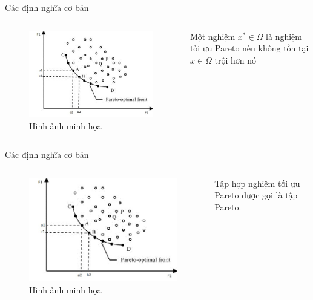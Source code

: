 \documentclass{beamer}
\begin{document}
    \begin{frame}{Các định nghĩa cơ bản}
        \begin{columns}
        \begin{figure}
            \centering
            \includegraphics[scale = 0.5]{paretofront.jpg}
            \caption{Hình ảnh minh họa}
            \label{fig:my_label}
        \end{figure}
        Một nghiệm $x^{*} \in \Omega$ là nghiệm tối ưu Pareto nếu không tồn tại $x \in \Omega$ trội hơn nó
        \end{columns}
    \end{frame}
    \begin{frame}{Các định nghĩa cơ bản}
        \begin{columns}
        \begin{figure}
            \centering
            \includegraphics[scale = 0.5]{paretofront.jpg}
            \caption{Hình ảnh minh họa}
            \label{fig:my_label}
        \end{figure}
        Tập hợp nghiệm tối ưu Pareto được gọi là tập Pareto.
        \end{columns}
    \end{frame}
\end{document}
